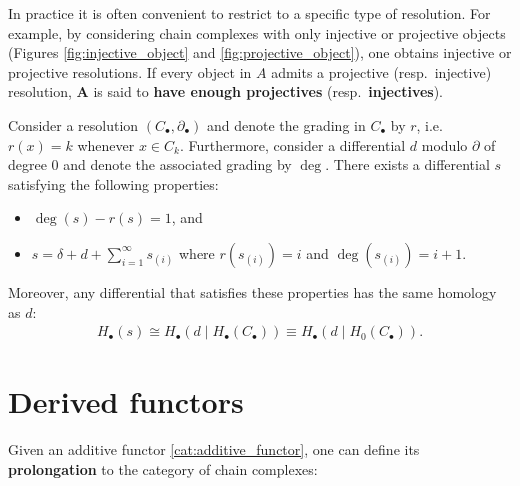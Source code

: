 	In practice it is often convenient to restrict to a specific type of resolution. For example, by considering chain complexes with only injective or projective objects (Figures \ref{fig:injective_object} and \ref{fig:projective_object}), one obtains injective or projective resolutions. If every object in $A$ admits a projective (resp.~injective) resolution, $\mathbf{A}$ is said to \textbf{have enough projectives} (resp.~\textbf{injectives}).

    \begin{theorem}\label{homalg:homological_perturbation}
        Consider a resolution $(C_\bullet,\partial_\bullet)$ and denote the grading in $C_\bullet$ by $r$, i.e.~$r(x)=k$ whenever $x\in C_k$. Furthermore, consider a differential $d$ modulo $\partial$ of degree 0 and denote the associated grading by $\deg$. There exists a differential $s$ satisfying the following properties:
        \begin{itemize}
            \item $\deg(s) - r(s) = 1$, and
            \item $s = \delta + d + \sum_{i=1}^\infty s_{(i)}$ where $r(s_{(i)})=i$ and $\deg(s_{(i)}) = i+1$.
        \end{itemize}
        Moreover, any differential that satisfies these properties has the same homology as $d$:
        \begin{gather}
            H_\bullet(s)\cong H_\bullet(d\mid H_\bullet(C_\bullet))\equiv H_\bullet(d\mid H_0(C_\bullet)).
        \end{gather}
    \end{theorem}

\section{Derived functors}

	Given an additive functor \ref{cat:additive_functor}, one can define its \textbf{prolongation} to the category of chain complexes:

